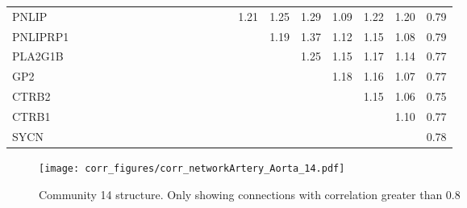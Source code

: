 \begin{longtable}{lrrrrrrrrrrrrrrrrrrrrr}
PNLIP    &              &              &              &             &             &             &             &            &            &            &            &             &           &             &           1.21 &          1.25 &      1.29 &        1.09 &        1.22 &       1.20 &        0.79 \\
PNLIPRP1 &              &              &              &             &             &             &             &            &            &            &            &             &           &             &                &          1.19 &      1.37 &        1.12 &        1.15 &       1.08 &        0.79 \\
PLA2G1B  &              &              &              &             &             &             &             &            &            &            &            &             &           &             &                &               &      1.25 &        1.15 &        1.17 &       1.14 &        0.77 \\
GP2      &              &              &              &             &             &             &             &            &            &            &            &             &           &             &                &               &           &        1.18 &        1.16 &       1.07 &        0.77 \\
CTRB2    &              &              &              &             &             &             &             &            &            &            &            &             &           &             &                &               &           &             &        1.15 &       1.06 &        0.75 \\
CTRB1    &              &              &              &             &             &             &             &            &            &            &            &             &           &             &                &               &           &             &             &       1.10 &        0.77 \\
SYCN     &              &              &              &             &             &             &             &            &            &            &            &             &           &             &                &               &           &             &             &            &        0.78 \\
\end{longtable}


\begin{figure}[h!]
\centering
\texttt{[image: corr\_figures/corr\_networkArtery\_Aorta\_14.pdf]}
\caption{Community 14 structure. Only showing connections with correlation greater than 0.8}
\end{figure}




